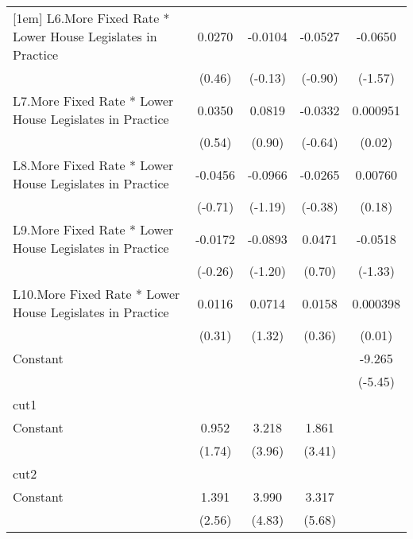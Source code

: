 {\begin{longtable}{l*{4}{c}}
[1em]
L6.More Fixed Rate * Lower House Legislates in Practice&   0.0270         &  -0.0104         &  -0.0527         &  -0.0650         \\
                &   (0.46)         &  (-0.13)         &  (-0.90)         &  (-1.57)         \\
[1em]
L7.More Fixed Rate * Lower House Legislates in Practice&   0.0350         &   0.0819         &  -0.0332         & 0.000951         \\
                &   (0.54)         &   (0.90)         &  (-0.64)         &   (0.02)         \\
[1em]
L8.More Fixed Rate * Lower House Legislates in Practice&  -0.0456         &  -0.0966         &  -0.0265         &  0.00760         \\
                &  (-0.71)         &  (-1.19)         &  (-0.38)         &   (0.18)         \\
[1em]
L9.More Fixed Rate * Lower House Legislates in Practice&  -0.0172         &  -0.0893         &   0.0471         &  -0.0518         \\
                &  (-0.26)         &  (-1.20)         &   (0.70)         &  (-1.33)         \\
[1em]
L10.More Fixed Rate * Lower House Legislates in Practice&   0.0116         &   0.0714         &   0.0158         & 0.000398         \\
                &   (0.31)         &   (1.32)         &   (0.36)         &   (0.01)         \\
[1em]
Constant        &                  &                  &                  &   -9.265\sym{***}\\
                &                  &                  &                  &  (-5.45)         \\
\hline
cut1            &                  &                  &                  &                  \\
Constant        &    0.952         &    3.218\sym{***}&    1.861\sym{***}&                  \\
                &   (1.74)         &   (3.96)         &   (3.41)         &                  \\
\hline
cut2            &                  &                  &                  &                  \\
Constant        &    1.391\sym{*}  &    3.990\sym{***}&    3.317\sym{***}&                  \\
                &   (2.56)         &   (4.83)         &   (5.68)         &                  \\

\end{longtable}}
